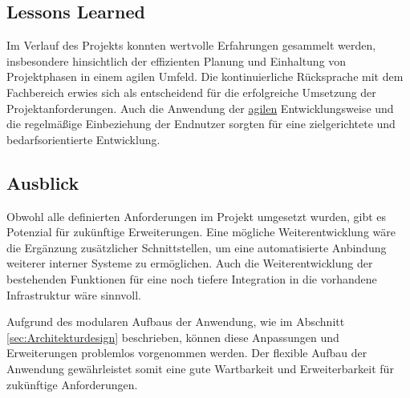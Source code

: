\subsection{Lessons Learned}
\label{sec:LessonsLearned}

Im Verlauf des Projekts konnten wertvolle Erfahrungen gesammelt werden, insbesondere hinsichtlich der effizienten Planung und Einhaltung von Projektphasen in einem agilen Umfeld. Die kontinuierliche Rücksprache mit dem Fachbereich erwies sich als entscheidend für die erfolgreiche Umsetzung der Projektanforderungen. Auch die Anwendung der \hyperlink{agil}{\textcolor{AOBlau}{agilen}} Entwicklungsweise und die regelmäßige Einbeziehung der Endnutzer sorgten für eine zielgerichtete und bedarfsorientierte Entwicklung.

\subsection{Ausblick}
\label{sec:Ausblick}

Obwohl alle definierten Anforderungen im Projekt umgesetzt wurden, gibt es Potenzial für zukünftige Erweiterungen. Eine mögliche Weiterentwicklung wäre die Ergänzung zusätzlicher Schnittstellen, um eine automatisierte Anbindung weiterer interner Systeme zu ermöglichen. Auch die Weiterentwicklung der bestehenden Funktionen für eine noch tiefere Integration in die vorhandene Infrastruktur wäre sinnvoll.

Aufgrund des modularen Aufbaus der Anwendung, wie im Abschnitt \ref{sec:Architekturdesign} beschrieben, können diese Anpassungen und Erweiterungen problemlos vorgenommen werden. Der flexible Aufbau der Anwendung gewährleistet somit eine gute Wartbarkeit und Erweiterbarkeit für zukünftige Anforderungen.
